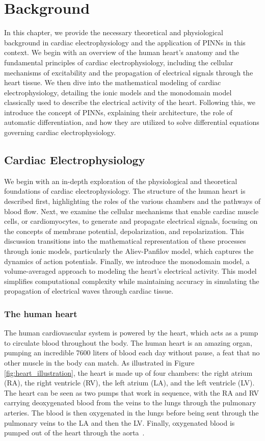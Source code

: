 \chapter{Background}
In this chapter, we provide the necessary theoretical and physiological background in cardiac electrophysiology and the application of PINNs in this context. We begin with an overview of the human heart's anatomy and the fundamental principles of cardiac electrophysiology, including the cellular mechanisms of excitability and the propagation of electrical signals through the heart tissue. We then dive into the mathematical modeling of cardiac electrophysiology, detailing the ionic models and the monodomain model classically used to describe the electrical activity of the heart. Following this, we introduce the concept of PINNs, explaining their architecture, the role of automatic differentiation, and how they are utilized to solve differential equations governing cardiac electrophysiology. 
\section{Cardiac Electrophysiology }
We begin with an in-depth exploration of the physiological and theoretical foundations of cardiac electrophysiology. The structure of the human heart is described first, highlighting the roles of the various chambers and the pathways of blood flow. Next, we examine the cellular mechanisms that enable cardiac muscle cells, or cardiomyocytes, to generate and propagate electrical signals, focusing on the concepts of membrane potential, depolarization, and repolarization. This discussion transitions into the mathematical representation of these processes through ionic models, particularly the Aliev-Panfilov model, which captures the dynamics of action potentials. Finally, we introduce the monodomain model, a volume-averaged approach to modeling the heart's electrical activity. This model simplifies computational complexity while maintaining accuracy in simulating the propagation of electrical waves through cardiac tissue. 
 
\subsection{The human heart}


The human cardiovascular system is powered by the heart, which acts as a pump to circulate blood throughout the body. The human heart is an amazing organ, pumping an incredible 7600 liters of blood each day without pause, a feat that no other muscle in the body can match. As illustrated in Figure \ref{fig:heart_illustration}, the heart is made up of four chambers: the right atrium (RA), the right ventricle (RV), the left atrium (LA), and the left ventricle (LV). The heart can be seen as two pumps that work in sequence, with the RA and RV carrying deoxygenated blood from the veins to the lungs through the pulmonary arteries. The blood is then oxygenated in the lungs before being sent through the pulmonary veins to the LA and then the LV. Finally, oxygenated blood is pumped out of the heart through the aorta~\cite{A.M.Katz}.

